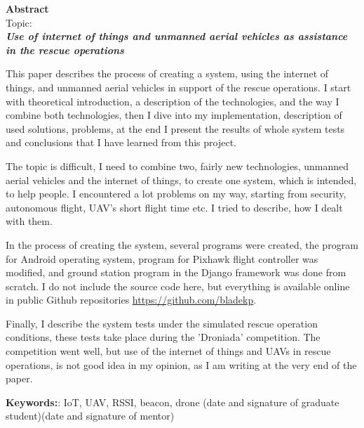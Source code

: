\newpage
\begin{center}
 {\large\bf Abstract} \\
\vskip 1cm
Topic:\\
\textit{\bf Use of internet of things and unmanned aerial vehicles as assistance in the rescue operations}
\end{center}
\vskip 1cm

This paper describes the process of creating a system, using the internet of things, and unmanned aerial vehicles in support of the rescue operations. I start with theoretical introduction, a description of the technologies, and the way I combine both technologies, then I dive into my implementation, description of used solutions, problems, at the end I present the results of whole system tests and conclusions that I have learned from this project.

The topic is difficult, I need to combine two, fairly new technologies, unmanned aerial vehicles and the internet of things, to create one system, which is intended, to help people. I encountered a lot problems on my way, starting from security, autonomous flight, UAV's short flight time etc. I tried to describe, how I dealt with them.

In the process of creating the system, several programs were created, the program for Android operating system, program for Pixhawk flight controller was modified, and ground station program in the Django framework was done from scratch. I do not include the source code here, but everything is available online in public Github repositories \url{https://github.com/bladekp}.

Finally, I describe the system tests under the simulated rescue operation conditions, these tests take place during the 'Droniada' competition. The competition went well, but use of the internet of things and UAVs in rescue operations, is not good idea in my opinion, as I am writing at the very end of the paper.

\vskip 2cm
\noindent
\textbf{Keywords:}: IoT, UAV, RSSI, beacon, drone
\vskip 2cm
\noindent
(date and signature of graduate student)\hfill (date and signature of mentor)
